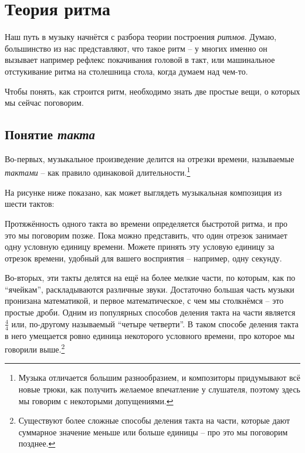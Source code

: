 \documentclass[a4paper,twoside]{book}
\begin{document}
\section{Теория ритма}

Наш путь в музыку начнётся с разбора теории построения \emph{ритмов}. Думаю,
большинство из нас представляют, что такое ритм -- у многих именно он вызывает
например рефлекс покачивания головой в такт, или машинальное отстукивание ритма
на столешница стола, когда думаем над чем-то.

Чтобы понять, как строится ритм, необходимо знать две простые вещи, о которых мы
сейчас поговорим.

\subsection{Понятие \emph{такта}}

Во-первых, музыкальное произведение делится на отрезки времени, называемые
\emph{тактами} -- как правило одинаковой длительности.\footnote{Музыка отличается
большим разнообразием, и композиторы придумывают всё новые трюки, как получить
желаемое впечатление у слушателя, поэтому здесь мы говорим с некоторыми
допущениями.}

На рисунке ниже показано, как может выглядеть музыкальная композиция из шести
тактов:


Протяжённость одного такта во времени определяется быстротой ритма, и про это мы
поговорим позже. Пока можно представить, что один отрезок занимает одну условную
единицу времени. Можете принять эту условую единицу за отрезок времени, удобный
для вашего восприятия -- например, одну секунду.

Во-вторых, эти такты делятся на ещё на более мелкие части, по которым, как по
``ячейкам'', раскладываются различные звуки. Достаточно большая часть музыки
пронизана математикой, и первое математическое, с чем мы столкнёмся -- это
простые дроби. Одним из популярных способов деления такта на части является
$\frac{4}{4}$ или, по-другому называемый ``четыре четверти''. В таком способе
деления такта в него умещается ровно единица некоторого условного времени, про
которое мы говорили выше.\footnote{Существуют более сложные способы деления
такта на части, которые дают суммарное значение меньше или больше единицы -- про
это мы поговорим позднее.}
\end{document}
